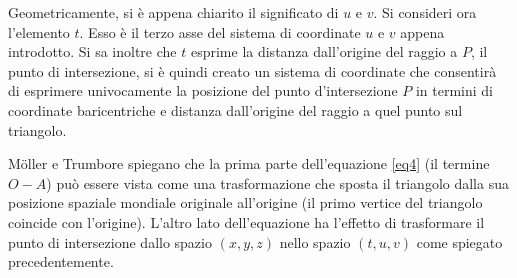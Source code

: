 Geometricamente, si è appena chiarito il significato di $u$ e $v$. Si consideri ora l'elemento $t$. Esso è il terzo asse del sistema di coordinate $u$ e $v$ appena introdotto. Si sa inoltre che $t$ esprime la distanza dall'origine del raggio a $P$, il punto di intersezione, si è quindi creato un sistema di coordinate che consentirà di esprimere univocamente la posizione del punto d'intersezione $P$ in termini di coordinate baricentriche e distanza dall'origine del raggio a quel punto sul triangolo.

M\"oller e Trumbore spiegano che la prima parte dell'equazione \ref{eq4} (il termine $O-A$) può essere vista come una trasformazione che sposta il triangolo dalla sua posizione spaziale mondiale originale all'origine (il primo vertice del triangolo coincide con l'origine). L'altro lato dell'equazione ha l'effetto di trasformare il punto di intersezione dallo spazio $(x,y,z)$ nello spazio $(t,u,v)$ come spiegato precedentemente.


